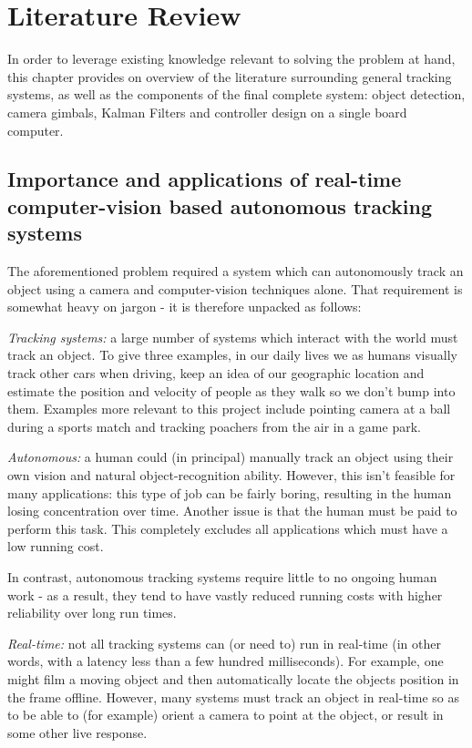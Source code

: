 \chapter{Literature Review}

In order to leverage existing knowledge relevant to solving the problem at hand, this chapter provides on overview of the literature surrounding general tracking systems, as well as the components of the final complete system: object detection, camera gimbals, Kalman Filters and controller design on a single board computer.

\section{Importance and applications of real-time computer-vision based autonomous tracking systems}
The aforementioned problem required a system which can autonomously track an object using a camera and computer-vision techniques alone. That requirement is somewhat heavy on jargon - it is therefore unpacked as follows:

\textit{Tracking systems:} a large number of systems which interact with the world must track an object. To give three examples, in our daily lives we as humans visually track other cars when driving, keep an idea of our geographic location and estimate the position and velocity of people as they walk so we don't bump into them. Examples more relevant to this project include pointing camera at a ball during a sports match and tracking poachers from the air in a game park.

\textit{Autonomous:} a human could (in principal) manually track an object using their own vision and natural object-recognition ability. However, this isn't feasible for many applications: this type of job can be fairly boring, resulting in the human losing concentration over time. Another issue is that the human must be paid to perform this task. This completely excludes all applications which must have a low running cost.

In contrast, autonomous tracking systems require little to no ongoing human work - as a result, they tend to have vastly reduced running costs with higher reliability over long run times.

\textit{Real-time:} not all tracking systems can (or need to) run in real-time (in other words, with a latency less than a few hundred milliseconds). For example, one might film a moving object and then automatically locate the objects position in the frame offline. However, many systems must track an object in real-time so as to be able to (for example) orient a camera to point at the object, or result in some other live response.

